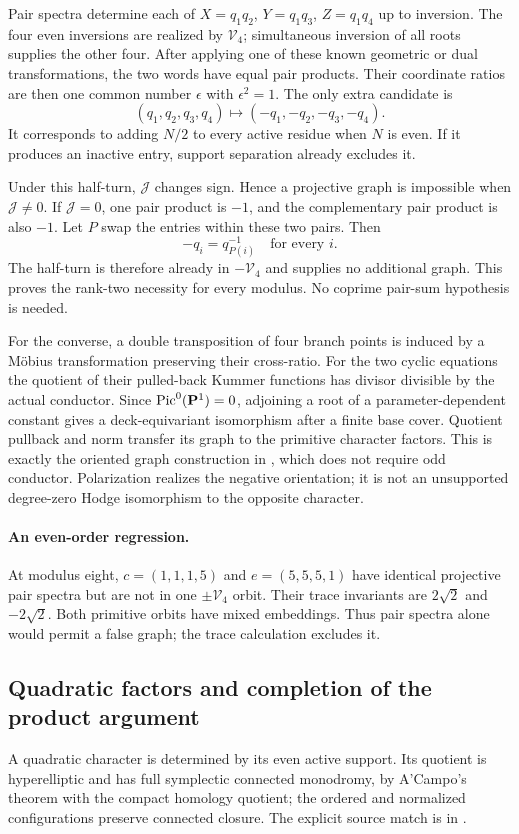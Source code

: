 \documentclass[11pt]{article}
\theoremstyle{remark}\newtheorem{remark}[theorem]{Remark}
\begin{document}
Pair spectra determine each of
$X=q_1q_2$, $Y=q_1q_3$, $Z=q_1q_4$ up to inversion. The four even
inversions are realized by $\mathcal V_4$; simultaneous inversion of
all roots supplies the other four. After applying one of these known
geometric or dual transformations, the two words have equal pair
products. Their coordinate ratios are then one common number $\epsilon$
with $\epsilon^2=1$. The only extra candidate is
\[
 (q_1,q_2,q_3,q_4)\longmapsto(-q_1,-q_2,-q_3,-q_4).
\]
It corresponds to adding $N/2$ to every active residue when $N$ is even.
If it produces an inactive entry, support separation already excludes it.

Under this half-turn, $\mathcal J$ changes sign. Hence a projective graph
is impossible when $\mathcal J\neq0$. If $\mathcal J=0$, one pair product
is $-1$, and the complementary pair product is also $-1$. Let $P$ swap
the entries within these two pairs. Then
\[
 -q_i=q_{P(i)}^{-1}\quad\text{for every }i.
\]
The half-turn is therefore already in $-\mathcal V_4$ and supplies no
additional graph. This proves the rank-two necessity for every modulus.
No coprime pair-sum hypothesis is needed.

For the converse, a double transposition of four branch points is induced
by a M\"obius transformation preserving their cross-ratio. For the two
cyclic equations the quotient of their pulled-back Kummer functions has
divisor divisible by the actual conductor. Since $\operatorname{Pic}^0
(\mathbf P^1)=0$, adjoining a root of a parameter-dependent constant gives a
deck-equivariant isomorphism after a finite base cover. Quotient pullback
and norm transfer its graph to the primitive character factors. This is
exactly the oriented graph construction in \cite[Section 3]{General},
which does not require odd conductor. Polarization realizes the negative
orientation; it is not an unsupported degree-zero Hodge isomorphism to
the opposite character.

\paragraph{An even-order regression.}
At modulus eight, $c=(1,1,1,5)$ and $e=(5,5,5,1)$ have identical
projective pair spectra but are not in one $\pm\mathcal V_4$ orbit.
Their trace invariants are $2\sqrt2$ and $-2\sqrt2$. Both primitive
orbits have mixed embeddings. Thus pair spectra alone would permit a
false graph; the trace calculation excludes it.

\subsection{Quadratic factors and completion of the product argument}
A quadratic character is determined by its even active support. Its
quotient is hyperelliptic and has full symplectic connected monodromy,
by A'Campo's theorem with the compact homology quotient; the ordered and
normalized configurations preserve connected closure. The explicit source
match is in \cite[Section 7]{General}.
\end{document}
